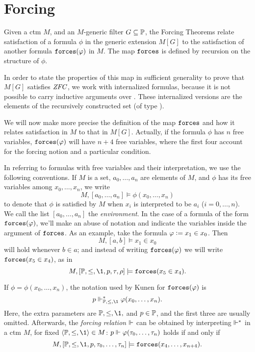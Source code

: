 \section{Forcing}
\label{sec:forcing}

Given a ctm $M$, and an $M$-generic filter $G\subseteq\mathbb{P}$, the Forcing
Theorems relate satisfaction of a formula 
$\phi$ in the generic extension $M[G]$ to the satisfaction of another
formula $\mathop{\mathtt{forces}}(\varphi)$ in $M$. The map $\mathop{\mathtt{forces}}$ is defined by
recursion on 
the structure of $\phi$. 


In order to state the properties of this map
in sufficient generality to prove that  $M[G]$ satisfies $\mathit{ZFC}$, we work with
internalized formulas, because it is not possible to carry inductive
arguments over \tyo. These internalized versions are the elements of
the recursively constructed set \formula{} (of type \tyi).

We will now make more precise the definition of the map
$\mathop{\mathtt{forces}}$ and how it relates satisfaction in $M$ to that in
$M[G]$. Actually, if the formula $\phi$ has $n$ free variables,
$\mathop{\mathtt{forces}}(\varphi)$ will have $n+4$ free variables, where the first four account
for the forcing notion and a particular condition. 

In referring to formulas with free variables and their interpretation,
we use the following conventions. If  $M$ is a set, $a_0,\dots,a_n$
are elements of $M$, and $\phi$ has its free variables
among $x_0,\dots,x_n$, we write
\[
M,[a_0,\dots,a_n] \models \phi(x_0,\dots,x_n)
\]
to denote that $\phi$ is satisfied by $M$ when $x_i$ is interpreted
to be $a_i$ ($i=0,\dots,n$). We call the list $[a_0,\dots,a_n]$ the
\emph{environment}. In the case of a formula of the form
$\mathop{\mathtt{forces}}(\varphi)$, we'll make an abuse of notation and indicate the
variables inside the argument of $\mathop{\mathtt{forces}}$. As an example, take the
formula $\varphi\mathrel{\mathop:}= x_1\in x_0$. Then
\[
M,[a,b] \models x_1\in x_0
\]
will hold whenever $b\in a$; and instead of writing $\mathop{\mathtt{forces}}(\varphi)$
we will write $\mathop{\mathtt{forces}}(x_5\in x_4)$, as in
\[
M,[\PP,\leq,\1,p,\tau,\rho] \models \forceisa(x_5\in x_4).
\]

If
$\phi=\phi(x_0,\dots,x_n)$, the notation used by Kunen
\cite{kunen2011set,kunen1980} for $\mathop{\mathtt{forces}}(\varphi)$ is 
\[
p\forces_{\PP,\leq,\1}^* \phi(x_0,\dots,x_n).
\]
Here, the extra parameters are $\PP,\leq,\1,$ and $p\in\mathbb{P}$, and the
first three are usually omitted. %
Afterwards, the \emph{forcing relation}
$\Vdash$ can be obtained by 
interpreting $\Vdash^*$ in a ctm $M$, for fixed
$\lb\PP,\leq,\1\rb\in M$: $p\Vdash \varphi(\tau_0,\dots,\tau_n)$ holds
if and only if
\begin{equation}\label{eq:3}
M,[\PP,\leq,\1,p,\tau_0,\dots,\tau_n]\models \forceisa(x_4,\dots,x_{n+4}).
\end{equation}

